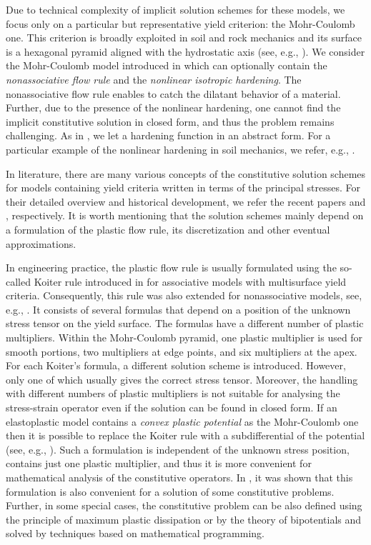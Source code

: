 \documentclass[a4paper,12pt]{article}
\theoremstyle{remark}
\numberwithin{equation}{section}
\begin{document}
Due to technical complexity of implicit solution schemes for these models, we focus only on a particular but representative yield criterion: the Mohr-Coulomb one. This criterion is broadly exploited in soil and rock mechanics and its surface is a hexagonal pyramid aligned with the hydrostatic axis (see, e.g., \cite{NPO08}). We consider the Mohr-Coulomb model introduced in \cite[Section 8]{NPO08} which can optionally contain the {\it nonassociative flow rule} and the {\it nonlinear isotropic hardening}. The nonassociative flow rule enables to catch the dilatant behavior of a material. Further, due to the presence of the nonlinear hardening, one cannot find the implicit constitutive solution in closed form, and thus the problem remains challenging. As in \cite{NPO08}, we let a hardening function in an abstract form. For a particular example of the nonlinear hardening in soil mechanics, we refer, e.g., \cite{BSS03}.

In literature, there are many various concepts of the constitutive solution schemes for models containing yield criteria written in terms of the principal stresses. For their detailed overview and historical development, we refer the recent papers \cite{CDA15} and \cite{K13}, respectively. It is worth mentioning that the solution schemes mainly depend on a formulation of the plastic flow rule, its discretization and other eventual approximations.

In engineering practice, the plastic flow rule is usually formulated using the so-called Koiter rule introduced in \cite{K53} for associative models with multisurface yield criteria. Consequently, this rule was also extended for nonassociative models, see, e.g., \cite{dB87}. It consists of several formulas that depend on a position of the unknown stress tensor  on the yield surface. The formulas have a different number of plastic multipliers. Within the Mohr-Coulomb pyramid, one plastic multiplier is used for smooth portions, two multipliers at edge points, and six multipliers at the apex. For each Koiter's formula, a different solution scheme is introduced. However,  only one of which usually gives the correct stress tensor. Moreover, the handling with different numbers of plastic multipliers is not suitable for analysing the stress-strain operator even if the solution can be found in closed form. If an elastoplastic model contains a {\it convex plastic potential} as the Mohr-Coulomb one then it is possible to replace the Koiter rule with a subdifferential of the potential (see, e.g., \cite{NPO08}). Such a formulation is independent of the unknown stress position, contains just one plastic multiplier, and thus it is more convenient for mathematical analysis of the constitutive operators. In \cite{SCKKZB15}, it was shown that this formulation is also convenient for a solution of some constitutive problems. Further, in some special cases, the constitutive problem can  be also defined using the principle of maximum plastic dissipation \cite{NPO08, HR99} or by the theory of bipotentials \cite{B12} and solved by techniques based on mathematical programming. 
\end{document}
